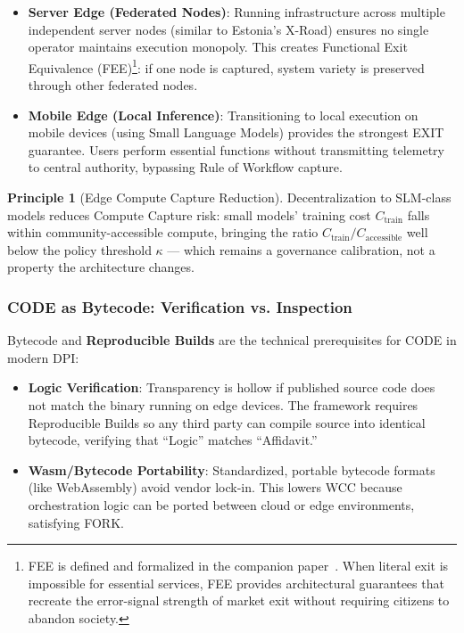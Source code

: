 \documentclass{article}
\theoremstyle{definition}
\newtheorem{principle}{Principle}[section]
\begin{document}
\begin{itemize}[noitemsep]
    \item \textbf{Server Edge (Federated Nodes)}: Running infrastructure across multiple independent server nodes (similar to Estonia's X-Road) ensures no single operator maintains execution monopoly. This creates Functional Exit Equivalence (FEE)\footnote{FEE is defined and formalized in the companion paper~\citep{aravind2026dpi}. When literal exit is impossible for essential services, FEE provides architectural guarantees that recreate the error-signal strength of market exit without requiring citizens to abandon society.}: if one node is captured, system variety is preserved through other federated nodes.

    \item \textbf{Mobile Edge (Local Inference)}: Transitioning to local execution on mobile devices (using Small Language Models) provides the strongest EXIT guarantee. Users perform essential functions without transmitting telemetry to central authority, bypassing Rule of Workflow capture.
\end{itemize}

\begin{principle}[Edge Compute Capture Reduction]
Decentralization to SLM-class models reduces Compute Capture risk: small models' training cost $C_{\text{train}}$ falls within community-accessible compute, bringing the ratio $C_{\text{train}}/C_{\text{accessible}}$ well below the policy threshold $\kappa$ --- which remains a governance calibration, not a property the architecture changes.
\end{principle}

\subsubsection{CODE as Bytecode: Verification vs. Inspection}

Bytecode and \textbf{Reproducible Builds} are the technical prerequisites for CODE in modern DPI:

\begin{itemize}[noitemsep]
    \item \textbf{Logic Verification}: Transparency is hollow if published source code does not match the binary running on edge devices. The framework requires Reproducible Builds so any third party can compile source into identical bytecode, verifying that ``Logic'' matches ``Affidavit.''

    \item \textbf{Wasm/Bytecode Portability}: Standardized, portable bytecode formats (like WebAssembly) avoid vendor lock-in. This lowers WCC because orchestration logic can be ported between cloud or edge environments, satisfying FORK.
\end{itemize}
\end{document}
